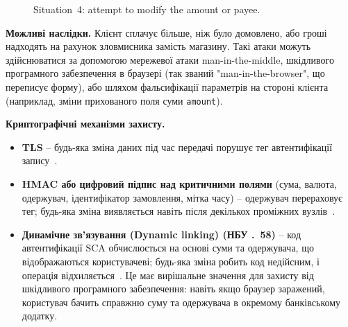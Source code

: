 \begin{figure}[H]
    \centering
    \caption{Situation~4: attempt to modify the amount or payee.}
    \label{fig:s4}
\end{figure}

\textbf{Можливі наслідки.} Клієнт сплачує більше, ніж було домовлено, або гроші надходять на рахунок зловмисника 
замість магазину. Такі атаки можуть здійснюватися за допомогою мережевої атаки man-in-the-middle, шкідливого 
програмного забезпечення в браузері (так званий "man-in-the-browser"{}, що переписує форму), або шляхом фальсифікації 
параметрів на стороні клієнта (наприклад, зміни прихованого поля суми \texttt{amount}).

\textbf{Криптографічні механізми захисту.}
\begin{itemize}[noitemsep]
    \item \textbf{TLS} -- будь-яка зміна даних під час передачі порушує тег автентифікації запису~\cite{rfc9846}.
    \item \textbf{HMAC або цифровий підпис над критичними полями} (сума, валюта, одержувач, ідентифікатор 
        замовлення, мітка часу) -- одержувач перераховує тег; будь-яка зміна виявляється навіть після декількох 
        проміжних вузлів~\cite{rfc2104}.
    \item \textbf{Динамічне зв'язування (Dynamic linking) (НБУ \No.~58)} -- код автентифікації SCA обчислюється 
        на основі суми та одержувача, що відображаються користувачеві; будь-яка зміна робить код недійсним, і 
        операція відхиляється~\cite[п.~22]{nbu58}. Це має вирішальне значення для захисту від шкідливого програмного 
        забезпечення: навіть якщо браузер заражений, користувач бачить справжню суму та одержувача в окремому 
        банківському додатку.
\end{itemize}

